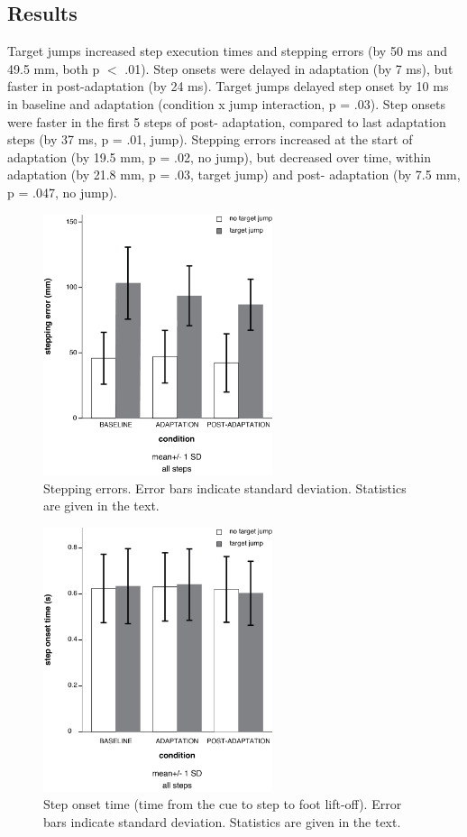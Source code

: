 \subsection{Results}
Target jumps increased step execution times and stepping errors (by 50 ms and 49.5 mm, both p $<$ .01).  Step onsets were delayed in adaptation (by 7 ms), but faster in post-adaptation (by 24 ms). Target jumps delayed step onset by 10 ms in baseline and adaptation (condition x jump interaction, p = .03). Step onsets were faster in the first 5 steps of post- adaptation, compared to last adaptation steps (by 37 ms, p = .01, jump). Stepping errors increased at the start of adaptation (by 19.5 mm, p = .02, no jump), but decreased over time, within adaptation (by 21.8 mm, p = .03, target jump) and post- adaptation (by 7.5 mm, p = .047, no jump).

\begin{figure}[!ht]
	\centering
    \includegraphics[width=0.6\textwidth]{"Zrinka/step error-all steps"}
	\caption{Stepping errors. Error bars indicate standard deviation. Statistics are given in the text.}
	\label{fig:stepErrorAll}
\end{figure}

\begin{figure}[!ht]
	\centering
	\includegraphics[width=0.6\textwidth]{"Zrinka/step onset time-all steps"}
	\caption{Step onset time (time from the cue to step to foot lift-off). Error bars indicate standard deviation. Statistics are given in the text.}
	\label{fig:stepOnsetTimeAll}
\end{figure}

